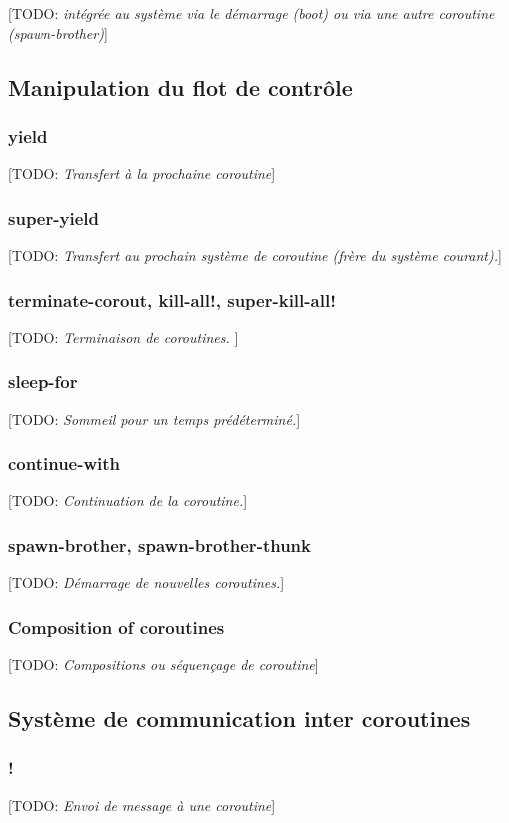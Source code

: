 \documentclass[12pt,oneside,letterpaper,francais]{book}
\newcommand{\todo}[1]{[TODO: {\it #1}]}
\begin{document}
\todo{intégrée au système via le démarrage (boot) ou via une autre
  coroutine (spawn-brother)}

\subsection{Manipulation du flot de contrôle}
\subsubsection{yield} 
\todo{Transfert à la prochaine coroutine}

\subsubsection{super-yield} 
\todo{Transfert au prochain système de coroutine (frère du système courant).}

\subsubsection{terminate-corout, kill-all!, super-kill-all!}
\todo{Terminaison de coroutines. }

\subsubsection{sleep-for}
\todo{Sommeil pour un temps prédéterminé.}

\subsubsection{continue-with}
\todo{Continuation de la coroutine.}

\subsubsection{spawn-brother, spawn-brother-thunk}
\todo{Démarrage de nouvelles coroutines.}

\subsubsection{Composition of coroutines}
\todo{Compositions ou séquençage de coroutine}

\subsection{Système de communication inter coroutines}
\subsubsection{!} 
\todo{Envoi de message à une coroutine}
\end{document}
